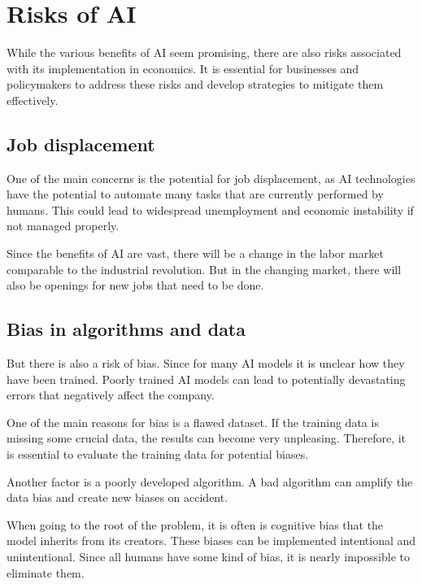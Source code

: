 \section{Risks of AI}
\label{sec:risks-of-ai}

While the various benefits of AI seem promising, there are also risks associated with its implementation in economics.
It is essential for businesses and policymakers to address these risks and develop strategies to mitigate them effectively.

\cite{AiEconomics}

\subsection{Job displacement}
\label{subsec:job-displacement}

One of the main concerns is the potential for job displacement, as AI technologies have the potential to automate many tasks that are currently performed by humans. This could lead to widespread unemployment and economic instability if not managed properly. 

Since the benefits of AI are vast, there will be a change in the labor market comparable to the industrial revolution.  
But in the changing market, there will also be openings for new jobs that need to be done. 

\cite{AiAndJobs} 

\subsection{Bias in algorithms and data}
\label{subsec:bias-in-algorithms-and-data}

But there is also a risk of bias. Since for many AI models it is unclear how they have been trained. 
Poorly trained AI models can lead to potentially devastating errors that negatively affect the company.

One of the main reasons for bias is a flawed dataset. If the training data is missing some crucial data, the results can become very unpleasing. 
Therefore, it is essential to evaluate the training data for potential biases.

Another factor is a poorly developed algorithm. A bad algorithm can amplify the data bias and create new biases on accident. 

When going to the root of the problem, it is often is cognitive bias that the model inherits from its creators. 
These biases can be implemented intentional and unintentional. Since all humans have some kind of bias, it is nearly impossible to eliminate them. 

